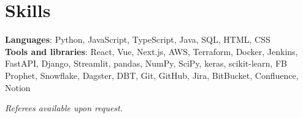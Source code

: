 \documentclass[a4paper,11pt]{article}
\begin{document}
\section{Skills}
\begin{itemize}[leftmargin=0.15in, label={}]
  \small{\item{
        \textbf{Languages}{:
          Python,
          JavaScript,
          TypeScript,
          Java,
          SQL,
          HTML,
          CSS
        } \\
        \textbf{Tools and libraries}{:
          React,
          Vue,
          Next.js,
          AWS,
          Terraform,
          Docker,
          Jenkins,
          FastAPI,
          Django,
          Streamlit,
          pandas,
          NumPy,
          SciPy,
          keras,
          scikit-learn,
          FB Prophet,
          Snowflake,
          Dagster,
          DBT,
          Git,
          GitHub,
          Jira,
          BitBucket,
          Confluence,
          Notion
        } \\
        }}
\end{itemize}

\begin{center}
  \small \textit{Referees available upon request.}
\end{center}

\end{document}

